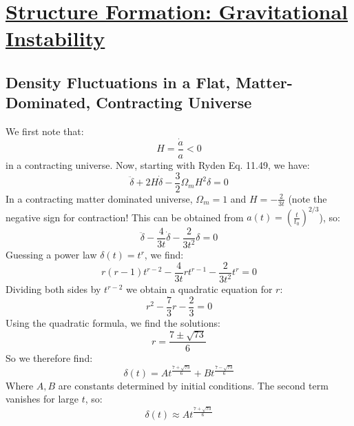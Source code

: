 \section[Structure Formation: Gravitational Instability]{\hyperlink{toc}{Structure Formation: Gravitational Instability}}

\subsection{Density Fluctuations in a Flat, Matter-Dominated, Contracting Universe}
We first note that:
\begin{equation}
    H = \frac{\dot{a}}{a} < 0
\end{equation}
in a contracting universe. Now, starting with Ryden Eq. 11.49, we have:
\begin{equation}
    \ddot{\delta} + 2H\dot{\delta} - \frac{3}{2}\Omega_m H^2\delta = 0
\end{equation}
In a contracting matter dominated universe, $\Omega_m = 1$ and $H = -\frac{2}{3t}$ (note the negative sign for contraction! This can be obtained from $a(t) = \left(\frac{t}{t_0}\right)^{2/3}$), so:
\begin{equation}
    \ddot{\delta} - \frac{4}{3t}\dot{\delta} - \frac{2}{3t^2}\delta = 0
\end{equation}
Guessing a power law $\delta(t) = t^r$, we find:
\begin{equation}
    r(r-1)t^{r-2} - \frac{4}{3t}rt^{r-1} - \frac{2}{3t^2}t^r = 0
\end{equation}
Dividing both sides by $t^{r-2}$ we obtain a quadratic equation for $r$:
\begin{equation}
    r^2 - \frac{7}{3}r - \frac{2}{3} = 0
\end{equation}
Using the quadratic formula, we find the solutions:
\begin{equation}
    r = \frac{7 \pm \sqrt{73}}{6}
\end{equation}
So we therefore find:
\begin{equation}
    \boxed{\delta(t) = At^{\frac{7 + \sqrt{73}}{6}} + Bt^{\frac{7 - \sqrt{73}}{6}}}
\end{equation}
Where $A, B$ are constants determined by initial conditions. The second term vanishes for large $t$, so:
\begin{equation}
    \boxed{\delta(t) \approx At^{\frac{7 + \sqrt{73}}{6}}}
\end{equation}

